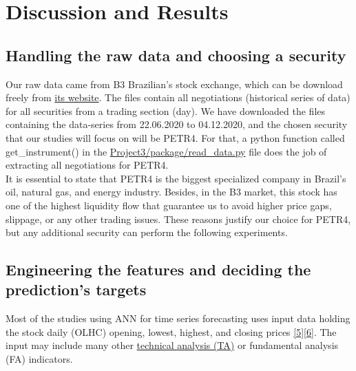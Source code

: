 \section{Discussion and Results}
\label{chap:Discussion and Results}

\subsection{Handling the raw data and choosing a security}
\label{chap:Handling the raw data and choosing a security}

\quad Our raw data came from B3 Brazilian's stock exchange, which can be download freely from \href{http://www.b3.com.br/pt_br/market-data-e-indices/servicos-de-dados/market-data/cotacoes/cotacoes/}{its website}. The files contain all negotiations (historical series of data) for all securities from a trading section (day). We have downloaded the files containing the data-series from 22.06.2020 to 04.12.2020, and the chosen security that our studies will focus on will be PETR4. For that, a python function called get\_instrument() in the \href{https://github.com/fabiorodp/UiO-FYS-STK4155/tree/master/Project3/package/read_data.py}{Project3/package/read\_data.py} file does the job of extracting all negotiations for PETR4.\\

It is essential to state that PETR4 is the biggest specialized company in Brazil's oil, natural gas, and energy industry. Besides, in the B3 market, this stock has one of the highest liquidity flow that guarantee us to avoid higher price gaps, slippage, or any other trading issues. These reasons justify our choice for PETR4, but any additional security can perform the following experiments.

\subsection{Engineering the features and deciding the prediction's targets}
\label{chap:Engineering the features and deciding the prediction's targets}

\quad Most of the studies using ANN for time series forecasting uses input data holding the stock daily (OLHC) opening, lowest, highest, and closing prices \hyperref[Bib:Leonardo C. Martinez, Diego N. da Hora, Joao R. de M. Palotti, Wagner Meira Jr. and Gisele L. Pappa]{[5]}\hyperref[Bib:Van-Dai Ta, Chuan-Ming Liu, Direselign Addis Tadesse]{[6]}. The input may include many other \hyperref[chap:Technical Analysis]{technical analysis (TA)} or fundamental analysis (FA) indicators.\\

